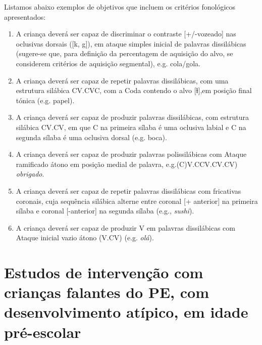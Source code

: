 \documentclass[output=paper,colorlinks,citecolor=brown,booklanguage=portuguese]{langscibook}
\begin{document}
Listamos abaixo exemplos de objetivos que incluem os critérios fonológicos apresentados:

\begin{enumerate}[label=Exemplo \arabic*., align =left]
\item A criança deverá ser capaz de discriminar o contraste [+/-vozeado] nas oclusivas dorsais ([k, g]), em ataque simples inicial de palavras dissilábicas (sugere-se que, para definição da percentagem de aquisição do alvo, se considerem critérios de aquisição segmental), e.g. cola/gola.

\item A criança deverá ser capaz de repetir palavras dissilábicas, com uma estrutura silábica CV.CVC, com a Coda contendo o alvo [ɫ],em posição final tónica (e.g. papel).

\item A criança deverá ser capaz de produzir palavras dissilábicas, com estrutura silábica CV.CV, em que C na primeira sílaba é uma oclusiva labial e C na segunda sílaba é uma oclusiva dorsal (e.g. boca).

\sloppy
\item A criança deverá ser capaz de produzir palavras polissilábicas com Ataque ramificado átono em posição medial de palavra, e.g.\newline (C)V.CCV.CV.CV) \emph{obrigado}.
\fussy

\item A criança deverá ser capaz de repetir palavras dissilábicas com fricativas coronais, cuja sequência silábica alterne entre coronal [+ anterior] na primeira sílaba e coronal [-anterior] na segunda sílaba (e.g., \emph{sushi}).

\item A criança deverá ser capaz de produzir V em palavras dissilábicas com Ataque inicial vazio átono (V.CV) (e.g. \emph{olá}).
\end{enumerate}

\section{Estudos de intervenção com crianças falan\-tes do PE, com desenvolvimento atípico, em idade pré-escolar}\label{sec:cap7sec4}
\end{document}
